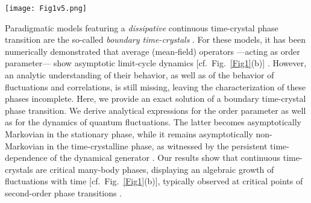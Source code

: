 \documentclass[prl,superscriptaddress,showpacs,longbibliography,reprint]{revtex4-2}
\begin{document}
\begin{figure*}[t]
\centering
\texttt{[image: Fig1v5.png]}
\caption{{\bf Stationary vs time-crystalline phase.} (a) A Markovian open quantum dynamics  ---implemented by a time-independent generator $\mathcal{L}$--- typically brings the system towards an asymptotic time-invariant state, $\rho_\mathrm{SS}$. Such a stationary state reflects the symmetry of $\mathcal{L}$, since time-translations do not change its properties, $e^{t'\mathcal{L}}[\rho_\mathrm{SS}]=\rho_\mathrm{SS}$. In this regime, system observables, as well as fluctuations, converge to a stationary value, at least far from critical points. (b) In a (continuous) time-crystalline phase, Markovian open quantum systems approach a limit cycle with time-dependent state $\rho_\mathrm{LC}(t)$. Here, the symmetry of the generator is broken given that continuous time-translations modify the position of the quantum state in the limit cycle, i.e.~$e^{t'\mathcal{L}}[\rho_\mathrm{LC}(t)]=\rho_\mathrm{LC}(t+t')\neq \rho_\mathrm{LC}(t)$. In this case, an appropriate  observable ---order parameter--- can witness the persistent oscillations of the asymptotic quantum state. In this paper, we show that in the presence of long-range (collective) dissipative effects, continuous time-crystalline phases feature a critical growth of fluctuations of the order parameter. }
\label{Fig1}
\end{figure*} 

Paradigmatic models featuring a {\it dissipative} continuous time-crystal phase transition are the so-called {\it boundary time-crystals} \cite{iemini2018,carollo2020,iemini2021,buonaiuto2021,piccitto2021}. 
For these models, it has been numerically demonstrated that average (mean-field) operators ---acting as order parameter--- show asymptotic limit-cycle dynamics  [cf.~Fig.~\ref{Fig1}(b)] \cite{iemini2018,iemini2021}. However, an analytic understanding of their behavior, as well as of the behavior of fluctuations and correlations, is still missing, leaving the characterization of these phases incomplete. Here, we provide an exact solution of a boundary time-crystal phase transition. We derive analytical expressions for the order parameter as well as for the dynamics of quantum fluctuations. The latter becomes asymptotically Markovian in the stationary phase, while it remains asymptotically non-Markovian in the time-crystalline phase, as witnessed by the persistent time-dependence of the dynamical generator \cite{chruscinski2010}. Our results show that continuous time-crystals are critical many-body phases, displaying an algebraic growth of fluctuations with time [cf.~Fig.~\ref{Fig1}(b)], typically observed at critical points of second-order phase transitions \cite{onsager1944,fisher1998,hinrichsen2000,gallavotti2013}. \vspace{10pt}
\end{document}
